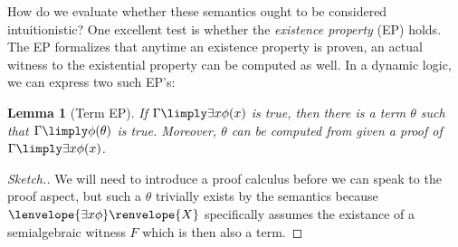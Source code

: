\documentclass[12pt]{cmuthesis}
\newtheorem{lemma}[theorem]{Lemma}
\theoremstyle{definition}
\theoremstyle{remark}
\newcommand{\fint}[1]{\lenvelope{#1}\renvelope}
\begin{document}
How do we evaluate whether these semantics ought to be considered intuitionistic?
One excellent test is whether the \emph{existence property} (EP) holds.
The EP formalizes that anytime an existence property is proven, an actual witness to the existential property can be computed as well.
In a dynamic logic, we can express two such EP's:
\begin{lemma}[Term EP]
If $\Gamma \limply \exists{x}{\phi(x)}$ is true, then there is a term $\theta$ such that $\Gamma \limply \phi(\theta)$ is true.
Moreover, $\theta$ can be computed from given a proof of $\Gamma \limply \exists{x}{\phi(x)}$.
\end{lemma}
\begin{proof}[Sketch.]
  We will need to introduce a proof calculus before we can speak to the proof aspect, but such a $\theta$ trivially exists by the semantics because $\fint{\exists{x}{\phi}}{X}$ specifically assumes
 the existance of a semialgebraic witness $F$ which is then also a term.
\end{proof}
\end{document}
